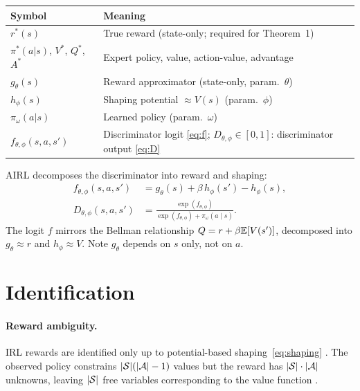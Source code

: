 \documentclass[11pt]{article}
\begin{document}
\begin{table}[h!]
\centering\small
\begin{tabular}{ll}
\toprule
Symbol & Meaning \\
\midrule
$r^*(s)$ & True reward (state-only; required for Theorem~1) \\
$\pi^*(a|s)$, $V^*$, $Q^*$, $A^*$ & Expert policy, value, action-value, advantage \\
\midrule
$g_\theta(s)$ & Reward approximator (state-only, param.\ $\theta$) \\
$h_\phi(s)$ & Shaping potential $\approx V(s)$ (param.\ $\phi$) \\
$\pi_\omega(a|s)$ & Learned policy (param.\ $\omega$) \\
$f_{\theta,\phi}(s,a,s')$ & Discriminator logit \eqref{eq:f}; \quad $D_{\theta,\phi} \in [0,1]$: discriminator output \eqref{eq:D} \\
\bottomrule
\end{tabular}
\end{table}
\FloatBarrier

AIRL decomposes the discriminator into reward and shaping:
\begin{align}
f_{\theta,\phi}(s,a,s') &= g_\theta(s) + \beta\, h_\phi(s') - h_\phi(s), \label{eq:f}\\[2pt]
D_{\theta,\phi}(s,a,s') &= \frac{\exp(f_{\theta,\phi})}{\exp(f_{\theta,\phi}) + \pi_\omega(a \mid s)}. \label{eq:D}
\end{align}
The logit $f$ mirrors the Bellman relationship $Q = r + \beta \mathbb{E}[V(s')]$, decomposed into $g_\theta \approx r$ and $h_\phi \approx V$.
Note $g_\theta$ depends on $s$ only, not on $a$.

\section{Identification}

\paragraph{Reward ambiguity.}
IRL rewards are identified only up to potential-based shaping~\eqref{eq:shaping} \citep{ng1999}.
The observed policy constrains $|\mathcal{S}|(|\mathcal{A}|-1)$ values but the reward has $|\mathcal{S}| \cdot |\mathcal{A}|$ unknowns, leaving $|\mathcal{S}|$ free variables corresponding to the value function \citep{cao2021}.
\end{document}
